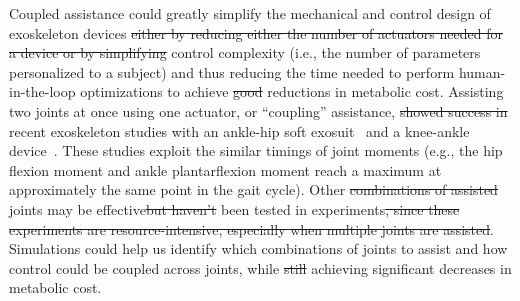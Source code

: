 \documentclass[10pt,letterpaper]{article}
\providecommand{\DIFaddtex}[1]{{\protect\color{blue}{#1}}} %
\providecommand{\DIFdeltex}[1]{{\protect\color{red}\sout{#1}}}                      %
\providecommand{\DIFaddbegin}{} %
\providecommand{\DIFaddend}{} %
\providecommand{\DIFdelbegin}{} %
\providecommand{\DIFdelend}{} %
\providecommand{\DIFadd}[1]{\texorpdfstring{\DIFaddtex{#1}}{#1}} %
\providecommand{\DIFdel}[1]{\texorpdfstring{\DIFdeltex{#1}}{}} %
\newcommand{\DIFscaledelfig}{0.5}
\newlength{\DIFdelgraphicswidth} %
\newlength{\DIFdelgraphicsheight} %
\newcommand{\DIFaddincludegraphics}[2][]{{\color{blue}\fbox{\DIFOincludegraphics[#1]{#2}}}} %
\newcommand{\DIFdelincludegraphics}[2][]{%
\sbox{\DIFdelgraphicsbox}{\DIFOincludegraphics[#1]{#2}}%
\settoboxwidth{\DIFdelgraphicswidth}{\DIFdelgraphicsbox} %
\settoboxtotalheight{\DIFdelgraphicsheight}{\DIFdelgraphicsbox} %
\scalebox{\DIFscaledelfig}{%
\parbox[b]{\DIFdelgraphicswidth}{\usebox{\DIFdelgraphicsbox}\\[-\baselineskip] \rule{\DIFdelgraphicswidth}{0em}}\llap{\resizebox{\DIFdelgraphicswidth}{\DIFdelgraphicsheight}{%
\setlength{\unitlength}{\DIFdelgraphicswidth}%
\begin{picture}(1,1)%
\thicklines\linethickness{2pt} %
{\color[rgb]{1,0,0}\put(0,0){\framebox(1,1){}}}%
{\color[rgb]{1,0,0}\put(0,0){\line( 1,1){1}}}%
{\color[rgb]{1,0,0}\put(0,1){\line(1,-1){1}}}%
\end{picture}%
}*{3pt}}} %
} %
\DeclareRobustCommand{\DIFaddbegin}{\DIFOaddbegin \let\includegraphics\DIFaddincludegraphics} %
\DeclareRobustCommand{\DIFaddend}{\DIFOaddend \let\includegraphics\DIFOincludegraphics} %
\DeclareRobustCommand{\DIFdelbegin}{\DIFOdelbegin \let\includegraphics\DIFdelincludegraphics} %
\DeclareRobustCommand{\DIFdelend}{\DIFOaddend \let\includegraphics\DIFOincludegraphics} %
\begin{document}
Coupled assistance could greatly simplify the mechanical and control design of exoskeleton devices \DIFdelbegin \DIFdel{either by reducing either the number of actuators needed for a device or by simplifying }\DIFdelend \DIFaddbegin \DIFadd{by reducing }\DIFaddend control complexity (i.e., the number of parameters personalized to a subject) and thus reducing the time needed to perform human-in-the-loop optimizations to achieve \DIFdelbegin \DIFdel{good }\DIFdelend \DIFaddbegin \DIFadd{desired }\DIFaddend reductions in metabolic cost. \DIFaddbegin \DIFadd{Coupled assistance could also simplify the mechanical design of exoskeletons which could make the device lighter and less restrictive for the sure. }\DIFaddend Assisting two joints at once using one actuator, or ``coupling'' assistance, \DIFdelbegin \DIFdel{showed success in }\DIFdelend \DIFaddbegin \DIFadd{produced significant reductions in metabolic cost in }\DIFaddend recent exoskeleton studies with an ankle-hip soft exosuit~\cite{Ding:2017, Panizzolo:2016, Quinlivan:2017, Lee:2018} and a knee-ankle device~\cite{Malcolm:2018}. These studies exploit the similar timings of joint moments (e.g., the hip flexion moment and ankle plantarflexion moment reach a maximum at approximately the same point in the gait cycle). Other \DIFdelbegin \DIFdel{combinations of assisted }\DIFdelend \DIFaddbegin \DIFadd{exoskeletons that assist multiple }\DIFaddend joints may be effective\DIFdelbegin \DIFdel{but haven't }\DIFdelend \DIFaddbegin \DIFadd{, but they have not }\DIFaddend been tested in experiments\DIFdelbegin \DIFdel{, since these experiments are resource-intensive, especially when multiple joints are assisted}\DIFdelend . Simulations could help us identify which combinations of joints to assist and how control could be coupled across joints, while \DIFdelbegin \DIFdel{still }\DIFdelend achieving significant decreases in metabolic cost.  
\end{document}
